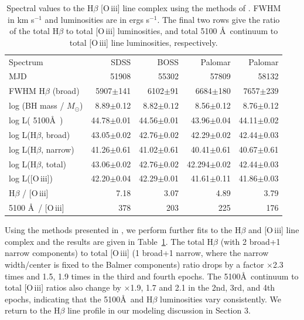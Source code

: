 \documentclass[a4paper,fleqn,usenatbib]{mnras}
\begin{document}
\begin{table}
 \centering
  \begin{tabular}{l r r r r}
    \hline \hline 
    Spectrum                             &	SDSS  &	BOSS    &	Palomar  & Palomar \\
    MJD                                     &    51908 &  55302  &    57809   &  58132   \\          
    \hline   
    FWHM H$\beta$ (broad)     &  5907$\pm$141      & 6102$\pm$91    & 6684$\pm$180  &7657$\pm$239  \\
    log (BH mass / $M_{\odot}$) & 8.89$\pm$0.12       & 8.82$\pm0.12$  & 8.56$\pm$0.12  & 8.76$\pm$0.12  \\
   log L( 5100\AA\ )                 & 44.78$\pm$0.01   &44.56$\pm$0.01  &43.96$\pm$0.04 & 44.11$\pm$0.02 \\
  log L(H$\beta$, broad)        & 43.05$\pm$0.02    & 42.76$\pm$0.02 &42.29$\pm$0.02   & 42.44$\pm$0.03 \\
    log L(H$\beta$, narrow)    & 41.26$\pm$0.61     & 41.02$\pm$0.61 & 40.41$\pm$0.61 & 40.67$\pm$0.61\\
   log L(H$\beta$, total)         & 43.06$\pm$0.02    &42.76$\pm$0.02 &42.294$\pm$0.02 & 42.44$\pm$0.03\\
log  L([O\,{\sc iii}])                & 42.20$\pm$0.04   &42.29$\pm$0.01 & 41.61$\pm$0.11& 41.86$\pm$0.03 \\
    H$\beta$  / [O\,{\sc iii}]         &  7.18 & 3.07   & 4.89 & 3.79  \\
   5100 \AA\  / [O\,{\sc iii}]         &  378 &  203 &  225 & 176  \\
   \hline \hline 
 \end{tabular}
 \caption{Spectral values to the H$\beta$ [O\,{\sc iii}] line complex using the methods
    of \citet{Jun2015a}.  FWHM in km s$^{-1}$ and luminosities are in ergs s$^{-1}$.  
  The final two rows give the ratio of the total H$\beta$ to total [O\,{\sc iii}] luminosities, 
and total 5100 \AA\ continuum to total [O\,{\sc iii}] line luminosities, respectively.} 
\label{tab:Hbeta_details}
\end{table}

Using the methods presented in \citet{Jun2015a}, we perform further
fits to the H$\beta$ and [O\,{\sc iii}] line complex and the results
are given in Table~\ref{tab:Hbeta_details}.  The total H$\beta$ (with
2 broad+1 narrow components) to total [O\,{\sc iii}] (1 broad+1
narrow, where the narrow width/center is fixed to the Balmer
components) ratio drops by a factor $\times$2.3 times and 1.5, 1.9
times in the third and fourth epochs. The 5100\AA\ continuum to total
[O\,{\sc iii}] ratios also change by $\times$1.9, 1.7 and 2.1 in the
2nd, 3rd, and 4th epochs, indicating that the 5100\AA\ and H$\beta$
luminosities vary consistently. We return to the H$\beta$ line profile
in our modeling discussion in Section 3.
\end{document}
